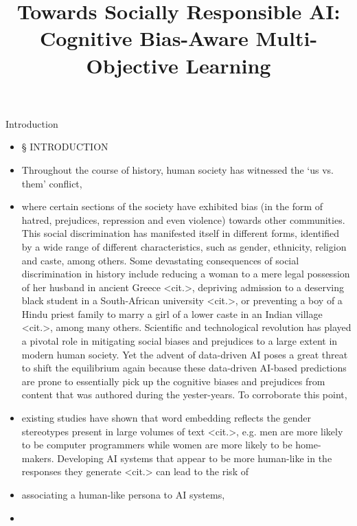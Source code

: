 \documentclass{beamer}
\title{Towards Socially Responsible AI: Cognitive Bias-Aware Multi-Objective Learning
}
\begin{document}
\normalsize
\maketitle
%
\begin{frame}{Introduction}
%
\begin{itemize}
\item
§ INTRODUCTION
\item
Throughout the course of history, human society has witnessed the `us vs. them' conflict,
\item
where certain sections of the society have exhibited bias (in the form of hatred, prejudices, repression and even violence) towards other communities. This social discrimination has manifested itself in different forms, identified by a wide range of different characteristics, such as gender, ethnicity, religion and caste, among others. Some devastating consequences of social discrimination in history include reducing a woman to a mere legal possession of her husband in ancient Greece <cit.>, depriving admission to a deserving black student in a South-African university <cit.>, or preventing a boy of a Hindu priest family to marry a girl of a lower caste in an Indian village <cit.>, among many others. Scientific and technological revolution has played a pivotal role in mitigating social biases and prejudices to a large extent in modern human society. Yet the advent of data-driven AI poses a great threat to shift the equilibrium again because these data-driven AI-based predictions are prone to essentially pick up the cognitive biases and prejudices from content that was authored during the yester-years. To corroborate this point,
\item
existing studies have shown that word embedding reflects the gender stereotypes present in large volumes of text <cit.>, e.g. men are more likely to be computer programmers while women are more likely to be home-makers. Developing AI systems that appear to be more human-like in the responses they generate <cit.> can lead to the risk of
\item
associating a human-like persona to AI systems,
\item

\end{itemize}
\end{frame}
\end{document}
